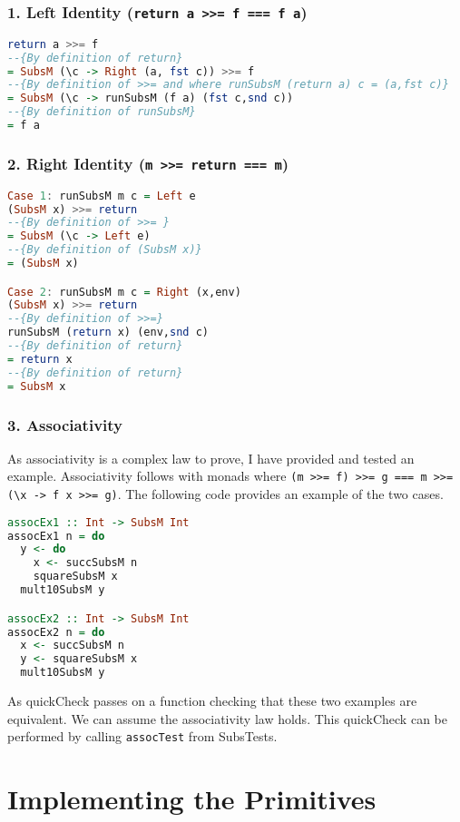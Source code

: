 \documentclass{article}
\begin{document}
\subsubsection{1. Left Identity (\texttt{return a >>= f === f a})}
\begin{lstlisting}[language=Haskell]
return a >>= f
--{By definition of return}
= SubsM (\c -> Right (a, fst c)) >>= f
--{By definition of >>= and where runSubsM (return a) c = (a,fst c)}
= SubsM (\c -> runSubsM (f a) (fst c,snd c))
--{By definition of runSubsM}
= f a
\end{lstlisting}

\subsubsection{2. Right Identity (\texttt{m >>= return === m})}
\begin{lstlisting}[language=Haskell]
Case 1: runSubsM m c = Left e
(SubsM x) >>= return
--{By definition of >>= }
= SubsM (\c -> Left e)
--{By definition of (SubsM x)}
= (SubsM x)

Case 2: runSubsM m c = Right (x,env)
(SubsM x) >>= return
--{By definition of >>=}
runSubsM (return x) (env,snd c)
--{By definition of return}
= return x
--{By definition of return}
= SubsM x
\end{lstlisting}
\subsubsection{3. Associativity}

As associativity is a complex law to prove, I have provided and tested an example. Associativity follows with monads where \texttt{(m >>= f)
>>= g === m >>= (\textbackslash x -> f x >>= g)}. The following code provides an example of the two cases.

\begin{lstlisting}[language=Haskell]
assocEx1 :: Int -> SubsM Int
assocEx1 n = do
  y <- do
    x <- succSubsM n
    squareSubsM x
  mult10SubsM y

assocEx2 :: Int -> SubsM Int
assocEx2 n = do
  x <- succSubsM n
  y <- squareSubsM x
  mult10SubsM y
\end{lstlisting}

As quickCheck passes on a function checking that these two examples are equivalent. We can assume the associativity law holds. This quickCheck can be performed by calling \texttt{assocTest} from SubsTests.

\section{Implementing the Primitives}
\end{document}
